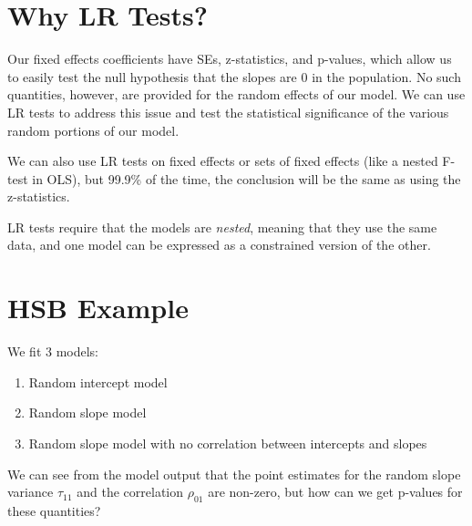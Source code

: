 \documentclass[
  letterpaper,
  DIV=11,
  numbers=noendperiod]{scrreprt}
\providecommand{\tightlist}{%
  \setlength{\itemsep}{0pt}\setlength{\parskip}{0pt}}\usepackage{longtable,booktabs,array}
\begin{document}
\hypertarget{why-lr-tests}{%
\section{Why LR Tests?}\label{why-lr-tests}}

Our fixed effects coefficients have SEs, z-statistics, and p-values,
which allow us to easily test the null hypothesis that the slopes are 0
in the population. No such quantities, however, are provided for the
random effects of our model. We can use LR tests to address this issue
and test the statistical significance of the various random portions of
our model.

We can also use LR tests on fixed effects or sets of fixed effects (like
a nested F-test in OLS), but 99.9\% of the time, the conclusion will be
the same as using the z-statistics.

LR tests require that the models are \emph{nested}, meaning that they
use the same data, and one model can be expressed as a constrained
version of the other.

\hypertarget{hsb-example}{%
\section{HSB Example}\label{hsb-example}}

We fit 3 models:

\begin{enumerate}
\def\labelenumi{\arabic{enumi}.}
\tightlist
\item
  Random intercept model
\item
  Random slope model
\item
  Random slope model with no correlation between intercepts and slopes
\end{enumerate}

We can see from the model output that the point estimates for the random
slope variance \(\tau_{11}\) and the correlation \(\rho_{01}\) are
non-zero, but how can we get p-values for these quantities?
\end{document}
